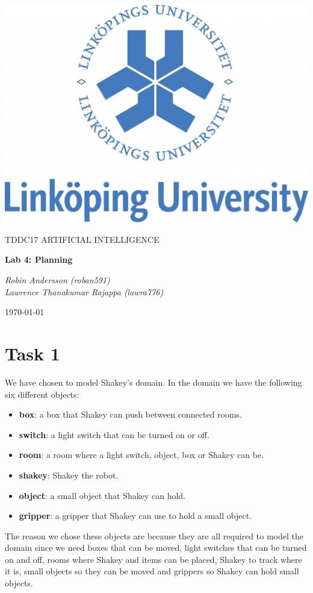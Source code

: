 \documentclass[a4paper,10pt]{article}
\begin{document}
\begin{titlepage}
	\centering
	\includegraphics[width=.6\textwidth]{liu-logo.png}\par
	\vfill
	{\scshape\Large TDDC17 ARTIFICIAL INTELLIGENCE\par}
	{\huge\bfseries Lab 4: Planning\par}
	\vspace{1cm}
	{\large\itshape Robin Andersson (roban591) \\ Lawrence Thanakumar Rajappa (lawra776)\par}
	\vfill
	{\large \today\par}
\end{titlepage}

\section*{Task 1}

We have chosen to model Shakey's domain.
In the domain we have the following six different objects:
\begin{itemize}
    \item \textbf{box}: a box that Shakey can push between connected rooms.
    \item \textbf{switch}: a light switch that can be turned on or off.
    \item \textbf{room}: a room where a light switch, object, box or Shakey can be.
    \item \textbf{shakey}: Shakey the robot.
    \item \textbf{object}: a small object that Shakey can hold.
    \item \textbf{gripper}: a gripper that Shakey can use to hold a small object.
\end{itemize}
The reason we chose these objects are because they are all required to model the domain since
we need boxes that can be moved, light switches that can be turned on and off, rooms where Shakey
and items can be placed, Shakey to track where it is, small objects so they can be moved and grippers
so Shakey can hold small objects.
\end{document}
